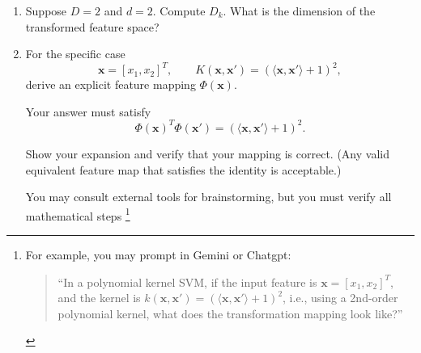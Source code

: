 \documentclass[12pt]{article}
\begin{document}
\begin{enumerate}
  \item Suppose \( D = 2 \) and \( d = 2 \).
    Compute \( D_k \).
    What is the dimension of the transformed feature space?

  \item For the specific case
    \[
      \bm{x} = [x_1, x_2]^T,
      \qquad
      K(\bm{x}, \bm{x}') = (\langle \bm{x}, \bm{x}' \rangle + 1)^2,
    \]
    derive an explicit feature mapping \( \Phi(\bm{x}) \).

    Your answer must satisfy
    \[
      \Phi(\bm{x})^T \Phi(\bm{x}')
      =
      (\langle \bm{x}, \bm{x}' \rangle + 1)^2.
    \]

    Show your expansion and verify that your mapping is correct.
    (Any valid equivalent feature map that satisfies the identity is acceptable.)

    You may consult external tools for brainstorming, but you must verify all mathematical steps \footnote{ For example, you may prompt in Gemini or Chatgpt:
      \begin{quote}
        ``In a polynomial kernel SVM, if the input feature is $\bm{x} = [x_1, x_2]^T$, and the kernel is $k(\bm{x}, \bm{x}') = (\langle \bm{x}, \bm{x}'\rangle + 1)^2$, i.e., using a 2nd-order polynomial kernel, what does the transformation mapping look like?''
    \end{quote}}
\end{enumerate}
\end{document}
